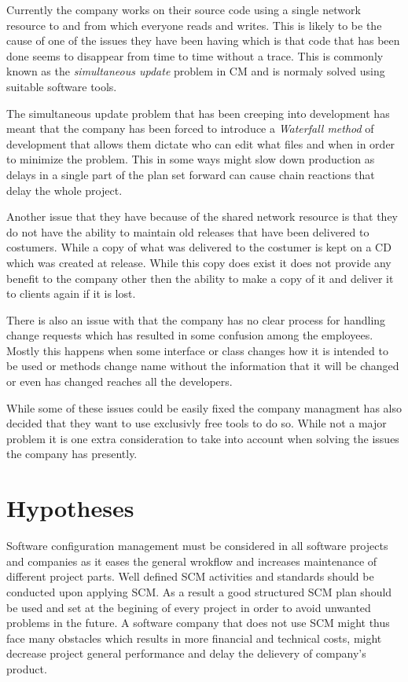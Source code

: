 \documentclass[a4paper]{article}
\begin{document}
Currently the company works on their source code using a single network resource to and from which everyone reads and writes. This is likely to be the cause of one of the issues they have been having which is that code that has been done seems to disappear from time to time without a trace. This is commonly known as the \emph{simultaneous update} problem in CM and is normaly solved using suitable software tools.

The simultaneous update problem that has been creeping into development has meant that the company has been forced to introduce a \emph{Waterfall method} of development that allows them dictate who can edit what files and when in order to minimize the problem. This in some ways might slow down production as delays in a single part of the plan set forward can cause chain reactions that delay the whole project.

Another issue that they have because of the shared network resource is that they do not have the ability to maintain old releases that have been delivered to costumers. While a copy of what was delivered to the costumer is kept on a CD which was created at release. While this copy does exist it does not provide any benefit to the company other then the ability to make a copy of it and deliver it to clients again if it is lost.

There is also an issue with that the company has no clear process for handling change requests which has resulted in some confusion among the employees. Mostly this happens when some interface or class changes how it is intended to be used or methods change name without the information that it will be changed or even has changed reaches all the developers.

While some of these issues could be easily fixed the company managment has also decided that they want to use exclusivly free tools to do so. While not a major problem it is one extra consideration to take into account when solving the issues the company has presently.

\section{Hypotheses}
Software configuration management must be considered in all software projects and companies as it eases the general wrokflow and increases maintenance of different project parts. Well defined SCM activities and standards should be conducted upon applying SCM. As a result a good structured SCM plan should be used and set at the begining of every project in order to avoid unwanted problems in the future. A software company that does not use SCM might thus face many obstacles which results in more financial and technical costs, might decrease project general performance and delay the delievery of company's product. 
\end{document}
